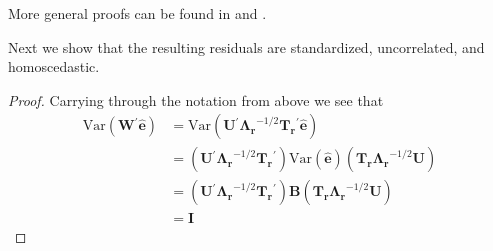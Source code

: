 \documentclass[11pt]{article} %
\newcommand{\trans}{\ensuremath{^\prime}}
\newcommand{\var}{\ensuremath{\mathrm{Var}}}
\begin{document}
More general proofs can be found in \cite{McDonald:1979ca} and \cite{deLeeuw:1982to}.

Next we show that the resulting residuals are standardized, uncorrelated, and homoscedastic.

\begin{proof} Carrying through the notation from above we see that
\begin{align*}
\var(\bm{W}\trans \widehat{\bm{e}}) &= \var(\bm{U}\trans \bm{\Lambda_r}^{-1/2} \bm{T_r}\trans \widehat{\bm{e}})\\
&= (\bm{U}\trans \bm{\Lambda_r}^{-1/2} \bm{T_r}\trans) \var(\widehat{\bm{e}}) (\bm{T_r \Lambda_r}^{-1/2} \bm{U})\\
&= (\bm{U}\trans \bm{\Lambda_r}^{-1/2} \bm{T_r}\trans) \bm{B} (\bm{T_r \Lambda_r}^{-1/2} \bm{U})\\
&= \bm{I}
\end{align*}

\end{proof}
\end{document}
